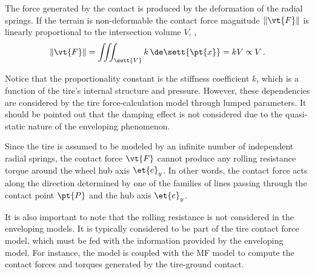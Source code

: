 \begin{observation}
  The force generated by the contact is produced by the deformation of the radial springs. If the terrain is non-deformable the contact force magnitude $\|\vt{F}\|$ is linearly proportional to the intersection volume $V$, \ie{},
  \begin{equation*}
    \| \vt{F} \| = \iiint_\sett{V} k \, \de\sett{\pt{x}} = k V \propto V
    \,\text{.}
  \end{equation*}
\end{observation}
%
Notice that the proportionality constant is the stiffness coefficient $k$, which is a function of the tire's internal structure and pressure. However, these dependencies are considered by the tire force-calculation model through lumped parameters. It should be pointed out that the damping effect is not considered due to the quasi-static nature of the enveloping phenomenon.
%
\begin{observation}
  Since the tire is assumed to be modeled by an infinite number of independent radial springs, the contact force $\vt{F}$ cannot produce any rolling resistance torque around the wheel hub axis $\et{e}_y$. In other words, the contact force acts along the direction determined by one of the families of lines passing through the contact point $\pt{P}$ and the hub axis $\et{e}_y$.
\end{observation}
%
It is also important to note that the rolling resistance is not considered in the enveloping models. It is typically considered to be part of the tire contact force model, which must be fed with the information provided by the enveloping model. For instance, the \Swift{} model is coupled with the \ac{MF} model to compute the contact forces and torques generated by the tire-ground contact.

